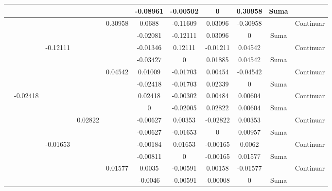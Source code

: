 \documentclass{article}
\begin{document}
\begin{figure}[H]
\begin{adjustwidth}{-4cm}{0cm}
{\begin{tabular}{|c|c|c|c|c|c|c|c|c|c|c|}
               &       &       &       &       &   -0.08961    &   -0.00502    &   0   &   0.30958 &   Suma    &       \\ \hline
               &       &       &       &   0.30958 &   0.0688  &   -0.11609    &   0.03096 &   -0.30958    &       &   Continuar   \\ \rowcolor{lightgray}
               &       &       &       &       &   -0.02081    &   -0.12111    &   0.03096 &   0   &   Suma    &       \\ \hline
               &       &   -0.12111    &       &       &   -0.01346    &   0.12111 &   -0.01211    &   0.04542 &       &   Continuar   \\ \rowcolor{lightgray}
               &       &       &       &       &   -0.03427    &   0   &   0.01885 &   0.04542 &   Suma    &       \\ \hline
               &       &       &       &   0.04542 &   0.01009 &   -0.01703    &   0.00454 &   -0.04542    &       &   Continuar   \\ \rowcolor{lightgray}
               &       &       &       &       &   -0.02418    &   -0.01703    &   0.02339 &   0   &   Suma    &       \\ \hline
               &   -0.02418    &       &       &       &   0.02418 &   -0.00302    &   0.00484 &   0.00604 &       &   Continuar   \\ \rowcolor{lightgray}
               &       &       &       &       &   0   &   -0.02005    &   0.02822 &   0.00604 &   Suma    &       \\ \hline
               &       &       &   0.02822 &       &   -0.00627    &   0.00353 &   -0.02822    &   0.00353 &       &   Continuar   \\ \rowcolor{lightgray}
               &       &       &       &       &   -0.00627    &   -0.01653    &   0   &   0.00957 &   Suma    &       \\ \hline
               &       &   -0.01653    &       &       &   -0.00184    &   0.01653 &   -0.00165    &   0.0062  &       &   Continuar   \\ \rowcolor{lightgray}
               &       &       &       &       &   -0.00811    &   0   &   -0.00165    &   0.01577 &   Suma    &       \\ \hline
               &       &       &       &   0.01577 &   0.0035  &   -0.00591    &   0.00158 &   -0.01577    &       &   Continuar   \\ \rowcolor{lightgray}
               &       &       &       &       &   -0.0046 &   -0.00591    &   -0.00008    &   0   &   Suma    &       \\ \hline

\end{tabular}}
\end{adjustwidth}
\end{figure}
\end{document}
